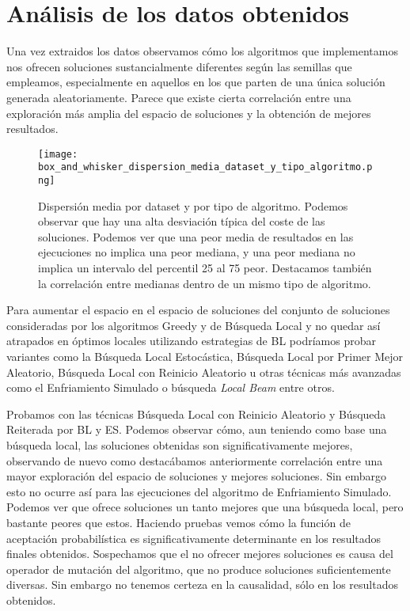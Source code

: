 \section{Análisis de los datos obtenidos}

Una vez extraidos los datos observamos cómo los algoritmos que implementamos nos ofrecen
soluciones sustancialmente diferentes según las semillas que empleamos, especialmente en
aquellos en los que parten de una única solución generada aleatoriamente. Parece que existe
cierta correlación entre una exploración más amplia del espacio de soluciones y
la obtención de mejores resultados.

\begin{figure}[H]
    \centering
    \texttt{[image: box\_and\_whisker\_dispersion\_media\_dataset\_y\_tipo\_algoritmo.png]}
    \caption{Dispersión media por dataset y por tipo de algoritmo. Podemos observar que hay una alta desviación típica del coste de las soluciones.
    Podemos ver que una peor media de resultados en las ejecuciones no implica una peor mediana, y una peor mediana no implica un intervalo del percentil 25 al 75 peor.
    Destacamos también la correlación entre medianas dentro de un mismo tipo de algoritmo.}
\end{figure}

Para aumentar el espacio en el espacio de soluciones del conjunto de soluciones consideradas por los algoritmos Greedy y de Búsqueda Local y no quedar
así atrapados en óptimos locales utilizando estrategias de BL podríamos probar variantes como la Búsqueda Local Estocástica, Búsqueda Local por Primer Mejor Aleatorio, Búsqueda Local
con Reinicio Aleatorio u otras técnicas más avanzadas como el Enfriamiento Simulado o búsqueda \textit{Local Beam} entre otros.\cite[Sección 4.1]{russell2020artificial}

Probamos con las técnicas Búsqueda Local con Reinicio Aleatorio y Búsqueda Reiterada por BL y ES.
Podemos observar cómo, aun teniendo como base una búsqueda local, las soluciones obtenidas son significativamente mejores, observando de nuevo como destacábamos anteriormente
correlación entre una mayor exploración del espacio de soluciones y mejores soluciones.
Sin embargo esto no ocurre así para las ejecuciones del algoritmo de Enfriamiento Simulado. Podemos ver que ofrece soluciones un tanto mejores que una búsqueda local, pero bastante
peores que estos. Haciendo pruebas vemos cómo la función de aceptación probabilística
es significativamente determinante en los resultados finales obtenidos. Sospechamos que el no ofrecer mejores soluciones
es causa del operador de mutación del algoritmo, que no produce soluciones suficientemente diversas. Sin embargo no tenemos certeza en la causalidad,
sólo en los resultados obtenidos.

